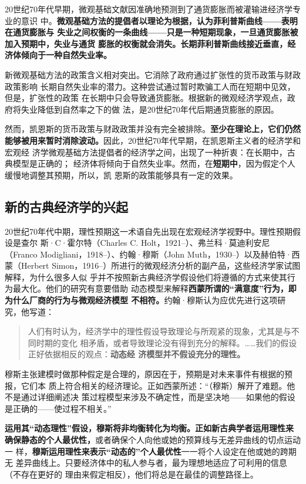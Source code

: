 20世纪70年代早期，微观基础文献因准确地预测到了通货膨胀而被灌输进经济学专业的意识
中。\textbf{微观基础方法的提倡者以理论为根据，认为菲利普斯曲线——表明在通货膨胀与
  失业之间权衡的一条曲线——只是一种短期现象，一旦通货膨胀被加入预期中，失业与通货
  膨胀的权衡就会消失。长期菲利普斯曲线接近垂直，经济体倾向于一种自然失业率。}

新微观基础方法的政策含义相对突出。它消除了政府通过扩张性的货币政策与财政政策影响
长期自然失业率的潜力。这种尝试通过暂时欺骗工人而在短期中见效，但是，扩张性的政策
在长期中只会导致通货膨胀。根据新的微观经济学观点，政府将失业降低到自然率之下的做
法，是20世纪70年代后期通货膨胀的原因。

然而，凯恩斯的货币政策与财政政策并没有完全被排除。\textbf{至少在理论上，它们仍然
  能够被用来暂时消除波动。}因此，20世纪70年代早期，在凯恩斯主义者的经济学和宏观经
济学微观基础方法提倡者的经济学之间，出现了一种折衷：在长期中，古典模型是正确的；
经济体将倾向于自然失业率。然而，在\textbf{短期中}，因为假定个人缓慢地调整其预期，所以，凯
恩斯的政策能够具有一定的效果。

\subsection{新的古典经济学的兴起}

20世纪70年代中期，理性预期这一术语自先出现在宏观经济学视野中。理性预期假设是查尔
斯·C·霍尔特（Charles C. Holt，1921--）、弗兰科·莫迪利安尼 （Franco
Modigliani，1918--）、约翰·穆斯（John Muth，1930--）以及赫伯特·西蒙（Herbert
Simon，1916--）所进行的微观经济分析的副产品，这些经济学家试图解释，为什么很多人似
乎并不按照新古典经济学假设他们将遵循的方式来使其行为最大化。他们的研究有意要借助
动态模型来解释\textbf{西蒙所谓的“满意度”行为，即为什么厂商的行为与微观经济模型
  不相符。}约翰·穆斯认为应优先进行这项研究，他写道：

\begin{quotation}
  人们有时认为，经济学中的理性假设导致理论与所观紧的现象，尤其是与不同时期的变化
  相矛盾，或者导致理论没有得到充分的解释。……我们的假设正好依据相反的观点：\textbf{动态经
  济模型并不假设充分的理性。}
\end{quotation}

穆斯主张建模时做那种假定是合理的，原因在于，预期是对未来事件有根据的预报，它们本
质上符合相关的经济理论。正如西蒙所述：“（穆斯）解开了难题。他不是通过详细阐述决
策过程模型来涉及不确定性，而是坚决地——如果他的假设是正确的——使过程不相关。”

\textbf{运用其“动态理性”假设，穆斯将非均衡转化为均衡。正如新古典学者运用理性来
  确保静态的个人最优性，}或者确保个人向他或她的预算线与无差异曲线的切点运动一
样，\textbf{穆斯运用理性来表示“动态的”个人最优性}一一将个人设定在他或她的跨期无
差异曲线上。只要经济体中的私人参与者，最为理想地适应了可利用的信息（不存在更好的
理由来假定相反），他们将总是在最佳的调整路径上。

